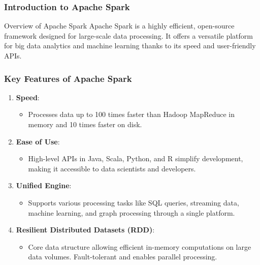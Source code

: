 \documentclass[aspectratio=169]{beamer}
\begin{document}
\frame{\titlepage}

\begin{frame}[fragile]
    \frametitle{Introduction to Apache Spark}
    \begin{block}{Overview of Apache Spark}
        Apache Spark is a highly efficient, open-source framework designed for large-scale data processing. It offers a versatile platform for big data analytics and machine learning thanks to its speed and user-friendly APIs.
    \end{block}
\end{frame}

\begin{frame}[fragile]
    \frametitle{Key Features of Apache Spark}
    \begin{enumerate}
        \item \textbf{Speed}:
            \begin{itemize}
                \item Processes data up to 100 times faster than Hadoop MapReduce in memory and 10 times faster on disk.
            \end{itemize}
            
        \item \textbf{Ease of Use}:
            \begin{itemize}
                \item High-level APIs in Java, Scala, Python, and R simplify development, making it accessible to data scientists and developers.
            \end{itemize}
    
        \item \textbf{Unified Engine}:
            \begin{itemize}
                \item Supports various processing tasks like SQL queries, streaming data, machine learning, and graph processing through a single platform.
            \end{itemize}
    
        \item \textbf{Resilient Distributed Datasets (RDD)}:
            \begin{itemize}
                \item Core data structure allowing efficient in-memory computations on large data volumes. Fault-tolerant and enables parallel processing.
            \end{itemize}
    \end{enumerate}
\end{frame}
\end{document}
